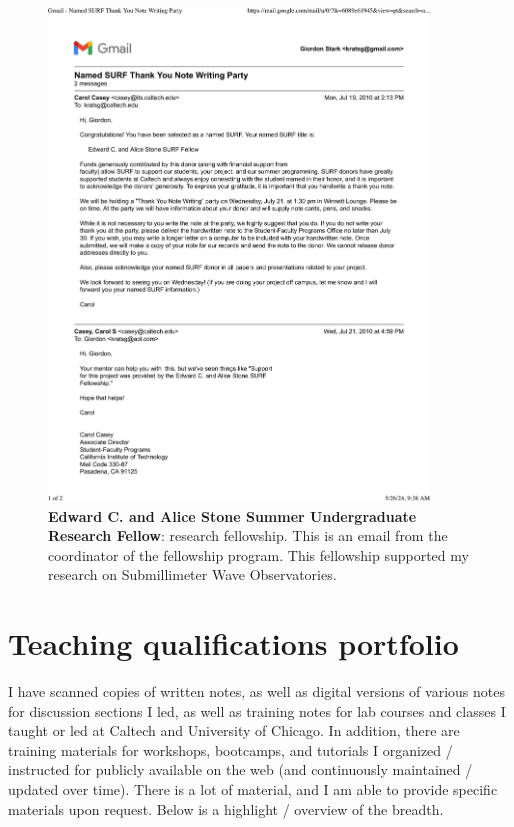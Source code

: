 \begin{figure}[h!]
	\centering
	\caption{\textbf{Edward C. and Alice Stone Summer Undergraduate Research Fellow}: research fellowship. This is an email from the coordinator of the fellowship program. This fellowship supported my research on Submillimeter Wave Observatories.}
	\includegraphics[width=0.9\textwidth]{attachments/D-research/SURFFellow}
\end{figure}


\chapter{Teaching qualifications portfolio}
I have scanned copies of written notes, as well as digital versions of various notes for discussion sections I led, as well as training notes for lab courses and classes I taught or led at Caltech and University of Chicago. In addition, there are training materials for workshops, bootcamps, and tutorials I organized / instructed for publicly available on the web (and continuously maintained / updated over time). There is a lot of material, and I am able to provide specific materials upon request. Below is a highlight / overview of the breadth.

